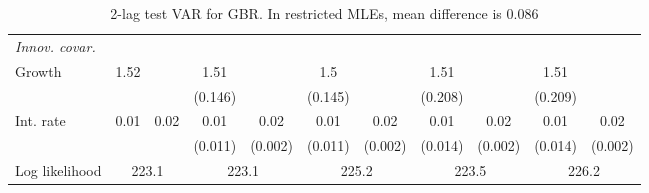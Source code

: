 \begin{table}[htbp]
\begin{tabular}{@{\extracolsep{4pt}}lcccccccccc@{}}
\rule{0pt}{4ex} \emph{Innov. covar.}  	 & 	 & 	 & 	 & 	 & 	 & 	 & 	 & 	 & 	 &\\ 
\quad Growth 	 &1.52 	 &  	 & 1.51 	 &  	 & 1.5 	 &  	 & 1.51 	 &  	 & 1.51 	 & 	 \\ 
 		 &  	 &  	 & (0.146) 	 &  	 & (0.145) 	 &  	 & (0.208) 	 &  	 & (0.209) 	 &  	 \\ 
\quad Int. rate 	 &0.01 	 & 0.02 	 & 0.01 	 & 0.02 	 & 0.01 	 & 0.02 	 & 0.01 	 & 0.02 	 & 0.01 	 & 0.02	 \\ 
 		 &  	 &  	 & (0.011) 	 & (0.002) 	 & (0.011) 	 & (0.002) 	 & (0.014) 	 & (0.002) 	 & (0.014) 	 & (0.002) 	 \\ 
 \hline \rule{0pt}{4ex} 
  Log likelihood 	 &\multicolumn{2}{c}{223.1} 	 & \multicolumn{2}{c}{223.1} 	 & \multicolumn{2}{c}{225.2} 	 & \multicolumn{2}{c}{223.5} 	 & \multicolumn{2}{c}{226.2}\\ 

 \hline 	\end{tabular}		\caption{2-lag test VAR for GBR. In restricted MLEs, mean difference is 0.086}
		\label{tab:GBR2lag}

\end{table}